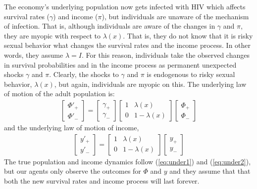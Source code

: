 The economy's underlying population now gets infected with HIV which affects survival rates ($\gamma$) and income ($\pi$), but individuals are unaware of the mechanism of infection. That is, although individuals are aware of the changes in $\gamma$ and $\pi$, they are myopic with respect to $\lambda(x)$. That is, they do not know that it is risky sexual behavior what changes the survival rates and the income process. In other words, they assume $\lambda=I$. For this reason, individuals take the observed changes in survival probabilities and in the income process as permanent unexpected shocks $\gamma$ and $\pi$. Clearly, the shocks to $\gamma$ and $\pi$ is endogenous to risky sexual behavior, $\lambda(x)$, but again, individuals are myopic on this. The underlying law of motion of the adult population is:
    \begin{align}\label{eq:under1}
        \begin{bmatrix} \Phi'_{+} \\ \Phi'_{-} \end{bmatrix} = \begin{bmatrix} \gamma_{+} \\ \gamma_{-} \end{bmatrix} \begin{bmatrix}  1  & \lambda(x) \\ 0 & 1-\lambda(x) \end{bmatrix} \begin{bmatrix} \Phi_{+} \\ \Phi_{-} \end{bmatrix}
    \end{align} and the underlying law of motion of income,
    \begin{align}\label{eq:under2}
        \begin{bmatrix} y'_{+} \\ y'_{-} \end{bmatrix} =  \begin{bmatrix}  1  & \lambda(x) \\ 0 & 1-\lambda(x) \end{bmatrix} \begin{bmatrix} y_{+} \\ y_{-} \end{bmatrix}
    \end{align}
The true population and income dynamics follow (\ref{eq:under1}) and (\ref{eq:under2}), but our agents only observe the outcomes for $\Phi$ and $y$ and they assume that that both the new survival rates and income process will last forever. \\

